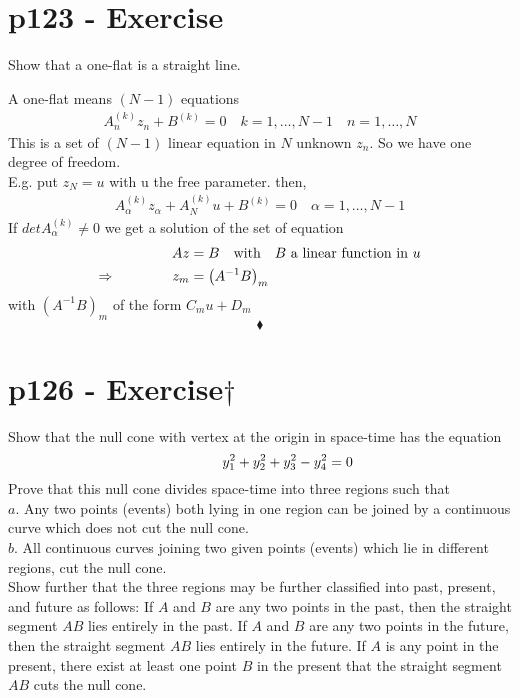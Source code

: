 \section{p123 - Exercise}
\begin{tcolorbox}
Show that a one-flat is a straight line.
\end{tcolorbox}
A one-flat means $(N-1)$ equations 
\begin{align}
A^{(k)}_nz_n + B^{(k)} =0 \quad k=1,\dots,N-1\quad n= 1,\dots,N
\end{align}
This is a set of $(N-1)$ linear equation in $N$ unknown $z_n$. So we have one degree of freedom.\\
E.g. put $z_N=u$ with u the free parameter. then,
\begin{align}
A^{(k)}_{\alpha}z_{\alpha}+ A^{(k)}_{N}u+ B^{(k)} =0 \quad \alpha=1,\dots,N-1
\end{align}
If $detA^{(k)}_{\alpha} \neq0$ we get a solution of the set of equation
\begin{align}
Az&=B \quad\text{with}\quad B \text{ a linear function in } u\\
\Rightarrow\quad\quad\quad\quad z_m&= \left(A^{-1}B\right)_m
\end{align}
with $\left(A^{-1}B\right)_m$ of the form $C_mu+D_m$
$$\blacklozenge$$
\newpage

\section{p126 - Exercise$\dagger$}
\begin{tcolorbox}
Show that the null cone with vertex at the origin in space-time has the equation $$\mathbf{\quad\quad\quad\quad} y^2_1+y^2_2+y^2_3-y^2_4=0$$
Prove that this null cone divides space-time into three regions such that \\
$\mathit{a.}$ Any two points (events) both lying in one region can be joined by a continuous curve which does not cut the null cone.\\
$\mathit{b.}$ All continuous curves joining two given points (events) which lie in different regions, cut the null cone.\\
Show further that the three regions may be further classified into past, present, and future as follows: If $A$ and $B$ are any two points in the past, then the straight segment $AB$ lies entirely in the past. If $A$ and $B$ are any two points in the future, then the straight segment $AB$ lies entirely in the future. If $A$ is any point in the present, there exist at least one point $B$ in the present that the straight segment $AB$ cuts the null cone.
\end{tcolorbox}

